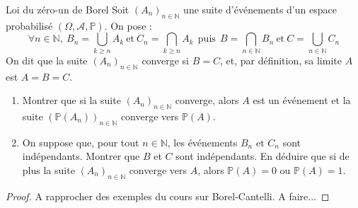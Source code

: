 \documentclass[french,a4paper]{article}
\renewcommand{\P}{\mathbb{P}}
\newcommand{\N}{\mathbb{N}}
\theoremstyle{plain}
\theoremstyle{definition}
\theoremstyle{remark}
\begin{document}
\begin{ex}{Loi du zéro-un de Borel}
	Soit $(A_n)_{n\in\N}$ une suite d'événements d'un espace probabilisé $(\Omega,\mathcal{A},\P)$. On pose : $$\forall n\in\N,\ B_n=\bigcup_{k\geqslant n}A_k \ \text{et} \ C_n=\bigcap_{k\geqslant n}A_k \ \ \text{puis}\ \ B=\bigcap_{n\in\N}B_n \ \text{et}\ C=\bigcup_{n\in\N}C_n$$ On dit que la suite $(A_n)_{n\in\N}$ converge si $B=C$, et, par définition, sa limite $A$ est $A=B=C$.
	\begin{enumerate}
		\item Montrer que si la suite $(A_n)_{n\in\N}$ converge, alors $A$ est un événement et la suite $(\P(A_n))_{n\in\N}$ converge vers $\P(A)$.
		\item On suppose que, pour tout $n\in\N$, les événements $B_n$ et $C_n$ sont indépendants. Montrer que $B$ et $C$ sont indépendants. En déduire que si de plus la suite $(A_n)_{n\in\N}$ converge vers $A$, alors $\P(A)=0$ ou $\P(A)=1$.
	\end{enumerate}
\end{ex}
\begin{proof}
	A rapprocher des exemples du cours sur Borel-Cantelli. A faire...
\end{proof}
\end{document}

